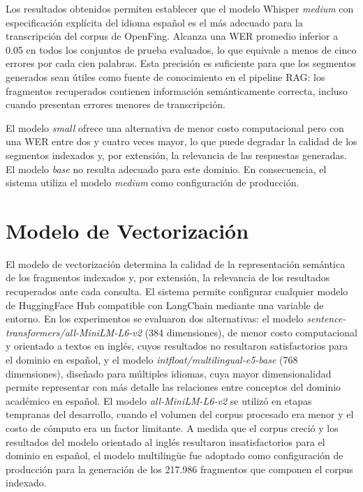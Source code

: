 Los resultados obtenidos permiten establecer que el modelo Whisper \textit{medium} con especificación explícita del idioma español es el más adecuado para la transcripción del corpus de OpenFing. Alcanza una WER promedio inferior a 0.05 en todos los conjuntos de prueba evaluados, lo que equivale a menos de cinco errores por cada cien palabras. Esta precisión es suficiente para que los segmentos generados sean útiles como fuente de conocimiento en el pipeline RAG: los fragmentos recuperados contienen información semánticamente correcta, incluso cuando presentan errores menores de transcripción.

El modelo \textit{small} ofrece una alternativa de menor costo computacional pero con una WER entre dos y cuatro veces mayor, lo que puede degradar la calidad de los segmentos indexados y, por extensión, la relevancia de las respuestas generadas. El modelo \textit{base} no resulta adecuado para este dominio. En consecuencia, el sistema utiliza el modelo \textit{medium} como configuración de producción.

\section{Modelo de Vectorización}
\label{section:6-Modelo de Vectorización}

El modelo de vectorización determina la calidad de la representación semántica de los fragmentos indexados y, por extensión, la relevancia de los resultados recuperados ante cada consulta. El sistema permite configurar cualquier modelo de HuggingFace Hub compatible con LangChain mediante una variable de entorno. En los experimentos se evaluaron dos alternativas: el modelo \textit{sentence-transformers/all-MiniLM-L6-v2} (384 dimensiones), de menor costo computacional y orientado a textos en inglés, cuyos resultados no resultaron satisfactorios para el dominio en español, y el modelo \textit{intfloat/multilingual-e5-base} (768 dimensiones), diseñado para múltiples idiomas, cuya mayor dimensionalidad permite representar con más detalle las relaciones entre conceptos del dominio académico en español. El modelo \textit{all-MiniLM-L6-v2} se utilizó en etapas tempranas del desarrollo, cuando el volumen del corpus procesado era menor y el costo de cómputo era un factor limitante. A medida que el corpus creció y los resultados del modelo orientado al inglés resultaron insatisfactorios para el dominio en español, el modelo multilingüe fue adoptado como configuración de producción para la generación de los 217.986 fragmentos que componen el corpus indexado.

